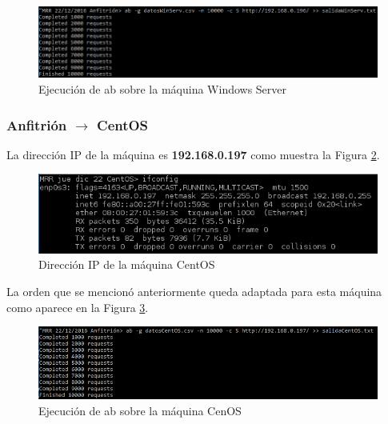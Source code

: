\begin{figure}[H] %
	\centering
	\includegraphics[scale=0.7]{figuras/ejercicio3/anf-winserver/figura3-2-2.png} 
	\caption{Ejecución de ab sobre la máquina Windows Server} 
	\label{fig:figura3-2-2}
\end{figure}

\subsubsection{Anfitrión $ \rightarrow $ CentOS }
La dirección IP de la máquina es \textbf{192.168.0.197} como muestra la Figura \ref{fig:figura3-3-1}.

\begin{figure}[H] %
	\centering
	\includegraphics[scale=0.9]{figuras/ejercicio3/anf-centos/figura3-3-1.png} 
	\caption{Dirección IP de la máquina CentOS} 
	\label{fig:figura3-3-1}
\end{figure}

La orden que se mencionó anteriormente queda adaptada para esta máquina como aparece en la Figura \ref{fig:figura3-3-2}.

\begin{figure}[H] %
	\centering
	\includegraphics[scale=0.7]{figuras/ejercicio3/anf-centos/figura3-3-2.png} 
	\caption{Ejecución de ab sobre la máquina CenOS} 
	\label{fig:figura3-3-2}
\end{figure}

